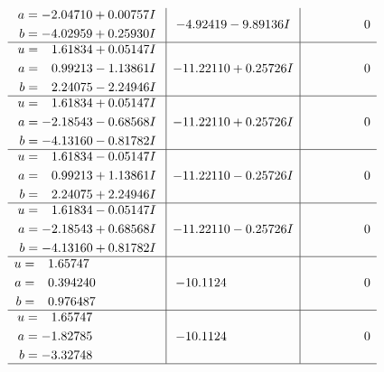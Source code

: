 \documentclass[1p]{elsarticle_modified}
\theoremstyle{definition}
\begin{document}
$$\begin{array}{c|c|c}
\begin{aligned}
a &= -2.04710 + 0.00757 I \\
b &= -4.02959 + 0.25930 I\end{aligned}
 & -4.92419 - 9.89136 I & \phantom{-0.000000 } 0 \\ \hline\begin{aligned}
u &= \phantom{-}1.61834 + 0.05147 I \\
a &= \phantom{-}0.99213 - 1.13861 I \\
b &= \phantom{-}2.24075 - 2.24946 I\end{aligned}
 & -11.22110 + 0.25726 I & \phantom{-0.000000 } 0 \\ \hline\begin{aligned}
u &= \phantom{-}1.61834 + 0.05147 I \\
a &= -2.18543 - 0.68568 I \\
b &= -4.13160 - 0.81782 I\end{aligned}
 & -11.22110 + 0.25726 I & \phantom{-0.000000 } 0 \\ \hline\begin{aligned}
u &= \phantom{-}1.61834 - 0.05147 I \\
a &= \phantom{-}0.99213 + 1.13861 I \\
b &= \phantom{-}2.24075 + 2.24946 I\end{aligned}
 & -11.22110 - 0.25726 I & \phantom{-0.000000 } 0 \\ \hline\begin{aligned}
u &= \phantom{-}1.61834 - 0.05147 I \\
a &= -2.18543 + 0.68568 I \\
b &= -4.13160 + 0.81782 I\end{aligned}
 & -11.22110 - 0.25726 I & \phantom{-0.000000 } 0 \\ \hline\begin{aligned}
u &= \phantom{-}1.65747\phantom{ +0.000000I} \\
a &= \phantom{-}0.394240\phantom{ +0.000000I} \\
b &= \phantom{-}0.976487\phantom{ +0.000000I}\end{aligned}
 & -10.1124\phantom{ +0.000000I} & \phantom{-0.000000 } 0 \\ \hline\begin{aligned}
u &= \phantom{-}1.65747\phantom{ +0.000000I} \\
a &= -1.82785\phantom{ +0.000000I} \\
b &= -3.32748\phantom{ +0.000000I}\end{aligned}
 & -10.1124\phantom{ +0.000000I} & \phantom{-0.000000 } 0\\
 \hline 
 \end{array}$$\newpage\newpage\renewcommand{\arraystretch}{1}
\end{document}
